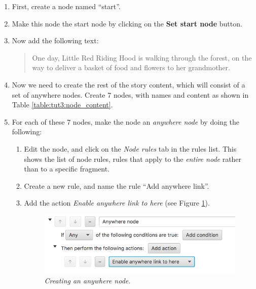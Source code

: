 \documentclass{article}
\begin{document}
\begin{enumerate}
  \item First, create a node named ``start''.
  \item Make this node the start node by clicking on the \textbf{Set start node} button.
  \item Now add the following text:

\begin{quotation}
\noindent One day, Little Red Riding Hood is walking through the forest, on the way to deliver a basket of food and flowers to her grandmother. 
\end{quotation}

\item Now we need to create the rest of the story content, which will consist of a set of anywhere nodes. Create 7 nodes, with names and content as shown in Table \ref{table:tut3:node_content}.
\item For each of these 7 nodes, make the node an \textit{anywhere node} by doing the following:
\begin{enumerate}
  \item Edit the node, and click on the \textit{Node rules} tab in the rules list. This shows the list of node rules, rules that apply to the \textit{entire node} rather than to a specific fragment.
  \item Create a new rule, and name the rule ``Add anywhere link''.
  \item Add the action \textit{Enable anywhere link to here} (see Figure \ref{fig:tut2:anywherenode}).

\begin{figure}[h]
  \centering
  \includegraphics[width=10cm]{images/hypedyn-tutorial-2-figure-9}
  \caption{\textit{Creating an anywhere node.}}
  \label{fig:tut2:anywherenode}
\end{figure} 
\end{enumerate}

\end{enumerate}
\end{document}
